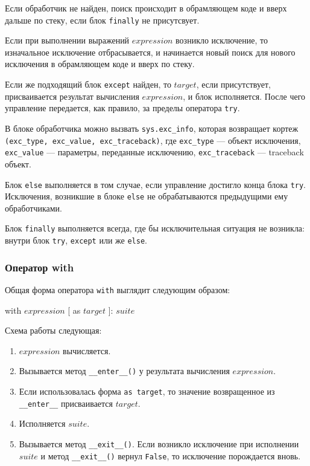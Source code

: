 Если обработчик не найден, поиск происходит в обрамляющем коде и вверх дальше по стеку, если блок \lstinline{finally} не присутсвует.

Если при выполнении выражений $expression$ возникло исключение, то изначальное исключение отбрасывается, и начинается новый поиск для нового исключения в обрамляющем коде и вверх по стеку.

Если же подходящий блок \lstinline{except} найден, то $target$, если присутствует, присваивается результат вычисления $expression$, и блок исполняется. После чего управление передается, как правило, за пределы оператора \lstinline{try}.

В блоке обработчика можно вызвать \lstinline{sys.exc_info}, которая возвращает кортеж \lstinline{(exc_type, exc_value, exc_traceback)}, где \lstinline{exc_type} --- объект исключения, \lstinline{exc_value} --- параметры, переданные исключению, \lstinline{exc_traceback} --- traceback объект.

Блок \lstinline{else} выполняется в том случае, если управление достигло конца блока \lstinline{try}. Исключения, возникшие в блоке \lstinline{else} не обрабатываются предыдущими ему обработчиками.

Блок \lstinline{finally} выполняется всегда, где бы исключительная ситуация не возникла: внутри блок \lstinline{try}, \lstinline{except} или же \lstinline{else}.

\subsubsection{Оператор with}
Общая форма оператора \lstinline{with} выглядит следующим образом:
\begin{pylst}{}{}
with $expression$ [ as $target$ ]: $suite$
\end{pylst}

Схема работы следующая:
\begin{enumerate}
  \item $expression$ вычисляется.
  \item Вызывается метод \lstinline{__enter__()} у результата вычисления $expression$.
  \item Если использовалась форма \lstinline{as target}, то значение возвращенное из \lstinline{__enter__} присваивается $target$.
  \item Исполняется $suite$.
  \item Вызывается метод \lstinline{__exit__()}. Если возникло исключение при исполнении $suite$ и метод \lstinline{__exit__()} вернул \lstinline{False}, то исключение порождается вновь.
\end{enumerate}


